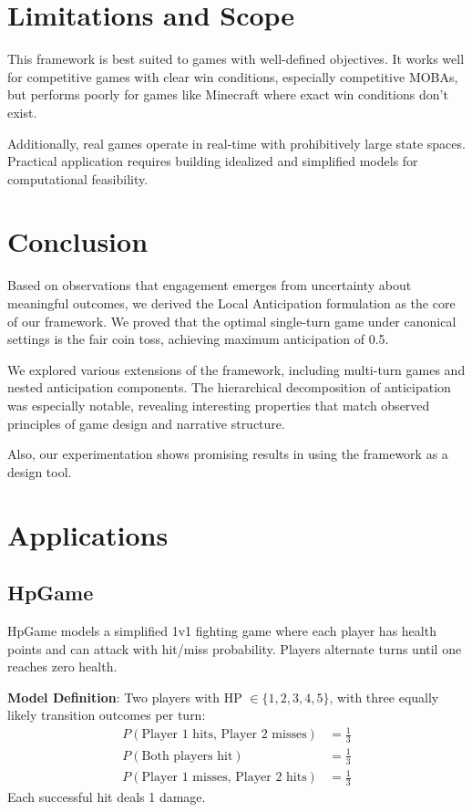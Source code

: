 \documentclass{article}
\begin{document}
\section{Limitations and Scope}

This framework is best suited to games with well-defined objectives. It works well for competitive games with clear win conditions, especially competitive MOBAs, but performs poorly for games like Minecraft where exact win conditions don't exist.

Additionally, real games operate in real-time with prohibitively large state spaces. Practical application requires building idealized and simplified models for computational feasibility.

\section{Conclusion}

Based on observations that engagement emerges from uncertainty about meaningful outcomes, we derived the Local Anticipation formulation as the core of our framework. We proved that the optimal single-turn game under canonical settings is the fair coin toss, achieving maximum anticipation of 0.5.

We explored various extensions of the framework, including multi-turn games and nested anticipation components. The hierarchical decomposition of anticipation was especially notable, revealing interesting properties that match observed principles of game design and narrative structure.

Also, our experimentation shows promising results in using the framework as a design tool.

\section{Applications}
\subsection{HpGame}

HpGame models a simplified 1v1 fighting game where each player has health points and can attack with hit/miss probability. Players alternate turns until one reaches zero health.

\textbf{Model Definition}: Two players with HP $\in \{1,2,3,4,5\}$, with three equally likely transition outcomes per turn:
\begin{align}
P(\text{Player 1 hits, Player 2 misses}) &= \frac{1}{3} \\
P(\text{Both players hit}) &= \frac{1}{3} \\
P(\text{Player 1 misses, Player 2 hits}) &= \frac{1}{3}
\end{align}
Each successful hit deals 1 damage.
\end{document}

